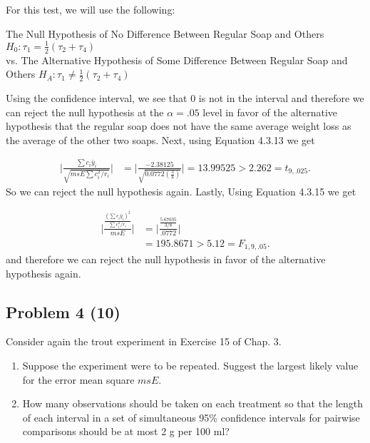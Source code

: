 \documentclass[12pt,]{article}
\begin{document}
For this test, we will use the following:

\begin{center}
 The Null Hypothesis of No Difference Between Regular Soap and Others  $H_0 : \tau_1 = \frac{1}{2}(\tau_2+ \tau_4)$ \\
 vs. The Alternative Hypothesis of Some Difference Between Regular Soap and Others $H_A : \tau_1 \neq \frac{1}{2}(\tau_2+ \tau_4)$
\end{center}

Using the confidence interval, we see that 0 is not in the interval and
therefore we can reject the null hypothesis at the \(\alpha=.05\) level
in favor of the alternative hypothesis that the regular soap does not
have the same average weight loss as the average of the other two soaps.
Next, using Equation 4.3.13 we get

\[
 \begin{aligned}
 \Bigg| \frac{\sum c_i \bar{y}_i}{\sqrt{msE \sum c_i^2/r_i}}  \Bigg|
 &=  \Bigg| \frac{-2.38125}{\sqrt{0.0772 \left( \frac{3}{8} \right)}}  \Bigg| = 13.99525 > 2.262 = t_{9,.025}.
  \end{aligned}
 \] So we can reject the null hypothesis again. Lastly, Using Equation
4.3.15 we get

\[
 \begin{aligned}
 \Bigg| \frac{ \frac{\left(\sum c_i \bar{y}_i\right)^2}{\sum c_i^2/r_i} }{ msE }  \Bigg|
 &=   \Bigg| \frac{ \frac{5.67035 }{3/8} }{ .0772 }  \Bigg|\\
 &=195.8671 > 5.12 = F_{1,9,.05}.
  \end{aligned}
 \] and therefore we can reject the null hypothesis in favor of the
alternative hypothesis again.

\subsection{Problem 4 (10)}\label{problem-4-10}

Consider again the trout experiment in Exercise 15 of Chap. 3.

\begin{enumerate}
\def\labelenumi{(\alph{enumi})}
\item
  Suppose the experiment were to be repeated. Suggest the largest likely
  value for the error mean square \(msE\).
\item
  How many observations should be taken on each treatment so that the
  length of each interval in a set of simultaneous 95\% confidence
  intervals for pairwise comparisons should be at most 2 g per 100 ml?
\end{enumerate}
\end{document}
